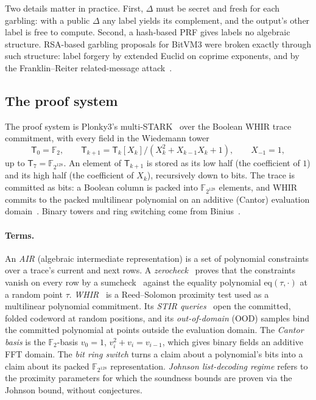 \documentclass[11pt]{article}
\newcommand{\F}{\mathbb{F}_{2^{128}}}
\newcommand{\T}{\mathsf{T}}
\begin{document}
Two details matter in practice. First, $\Delta$ must be secret and fresh for
each garbling: with a public $\Delta$ any label yields its complement, and the
output's other label is free to compute. Second, a hash-based PRF gives labels
no algebraic structure. RSA-based garbling proposals for BitVM3 were broken
exactly through such structure: label forgery by extended Euclid on coprime
exponents, and by the Franklin--Reiter related-message
attack~\cite{flb25}.

\subsection{The proof system}

The proof system is Plonky3's multi-STARK~\cite{plonky3} over the Boolean WHIR
trace commitment, with every field in the Wiedemann tower~\cite{wiedemann88}
\[
  \T_0=\mathbb{F}_2,\qquad \T_{k+1}=\T_k[X_k]/(X_k^2+X_{k-1}X_k+1),\qquad X_{-1}=1 ,
\]
up to $\T_7=\F$. An element of $\T_{k+1}$ is stored as its low half (the
coefficient of $1$) and its high half (the coefficient of $X_k$), recursively
down to bits. The trace is committed as bits: a Boolean column is packed into
$\F$ elements, and WHIR commits to the packed multilinear polynomial on an
additive (Cantor) evaluation domain~\cite{cantor89,lch14}. Binary towers and
ring switching come from Binius~\cite{dp25binius,dp24ringswitch}.

\paragraph{Terms.} An \emph{AIR} (algebraic intermediate representation) is a
set of polynomial constraints over a trace's current and next rows. A
\emph{zerocheck}~\cite{hyperplonk23} proves that the constraints vanish on every
row by a sumcheck~\cite{lfkn92}
against the equality polynomial $\mathrm{eq}(\tau,\cdot)$ at a random point
$\tau$. \emph{WHIR}~\cite{whir25} is a Reed--Solomon proximity test used as a multilinear
polynomial commitment. Its \emph{STIR queries}~\cite{stir24} open the committed, folded
codeword at random positions, and its \emph{out-of-domain} (OOD) samples bind the
committed polynomial at points outside the evaluation domain. The \emph{Cantor
basis} is the $\mathbb{F}_2$-basis $v_0=1$, $v_i^2+v_i=v_{i-1}$, which gives
binary fields an additive FFT domain. The \emph{bit ring switch} turns a claim
about a polynomial's bits into a claim about its packed $\F$ representation.
\emph{Johnson list-decoding regime} refers to the proximity parameters for which
the soundness bounds are proven via the Johnson bound, without conjectures.
\end{document}
